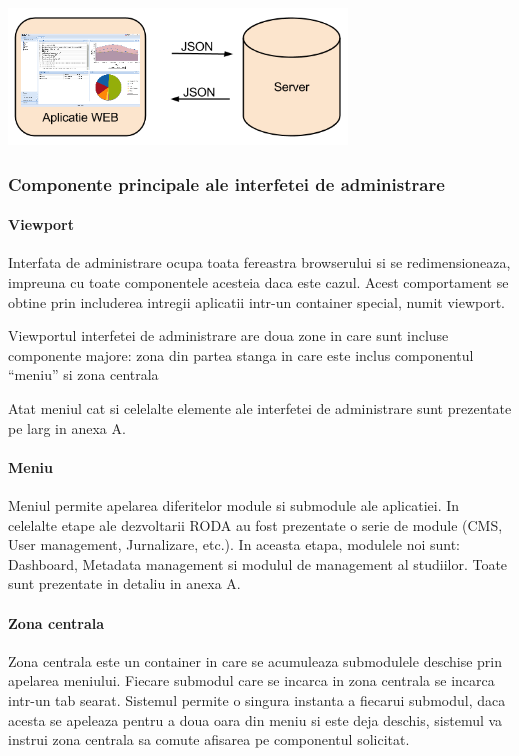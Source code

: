 \documentclass[a4paper, 10pt]{article}
\begin{document}
{\includegraphics[width=9cm]{img/json}

\subsubsection{Componente principale ale interfetei de administrare}

\paragraph{Viewport }

Interfata de administrare ocupa toata fereastra browserului si se
redimensioneaza, impreuna cu toate componentele acesteia daca este
cazul. Acest comportament se obtine prin includerea intregii aplicatii
intr-un container special, numit viewport.

Viewportul interfetei de administrare are doua zone in care sunt incluse
componente majore: zona din partea stanga in care este inclus componentul
\textquotedblleft{}meniu\textquotedblright{} si zona centrala 

Atat meniul cat si celelalte elemente ale interfetei de administrare
sunt prezentate pe larg in anexa A. 

\paragraph{Meniu}

Meniul permite apelarea diferitelor module si submodule ale aplicatiei.
In celelalte etape ale dezvoltarii RODA au fost prezentate o serie
de module (CMS, User management, Jurnalizare, etc.). In aceasta etapa,
modulele noi sunt: Dashboard, Metadata management si modulul de management
al studiilor. Toate sunt prezentate in detaliu in anexa A. 


\paragraph{Zona centrala }

Zona centrala este un container in care se acumuleaza submodulele
deschise prin apelarea meniului. Fiecare submodul care se incarca
in zona centrala se incarca intr-un tab searat. Sistemul permite o
singura instanta a fiecarui submodul, daca acesta se apeleaza pentru
a doua oara din meniu si este deja deschis, sistemul va instrui zona
centrala sa comute afisarea pe componentul solicitat. 

}
\end{document}
